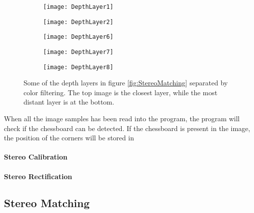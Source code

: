 \newpage

\begin{wrapfigure}{R}{0.4\textwidth}
\centering

	\begin{subfigure}[b]{0.35\textwidth}
        \texttt{[image: DepthLayer1]}
	\end{subfigure}
	\par\medskip
	\begin{subfigure}[b]{0.35\textwidth}
        \texttt{[image: DepthLayer2]}
	\end{subfigure}
	\par\medskip
	\begin{subfigure}[b]{0.35\textwidth}
        \texttt{[image: DepthLayer6]}
	\end{subfigure}
	\par\medskip
	\begin{subfigure}[b]{0.35\textwidth}
        \texttt{[image: DepthLayer7]}
	\end{subfigure}
	\par\medskip
	\begin{subfigure}[b]{0.35\textwidth}
        \texttt{[image: DepthLayer8]}
	\end{subfigure}
	
\caption{Some of the depth layers in figure \ref{fig:StereoMatching} separated by color filtering. The top image is the closest layer, while the most distant layer is at the bottom.}
\label{fig:layers2}
\end{wrapfigure}

When all the image samples has been read into the program, the program will check if the chessboard can be detected. If the chessboard is present in the image, the position of the corners will be stored in  

\paragraph{Stereo Calibration}

\paragraph{Stereo Rectification}


\subsection{Stereo Matching}

